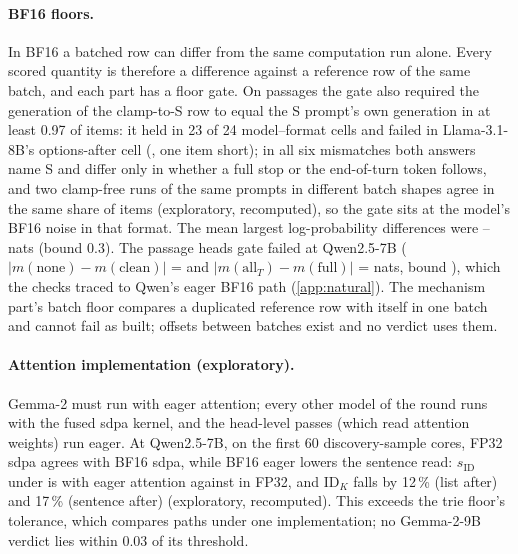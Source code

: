 \paragraph{BF16 floors.} In BF16 a batched row can differ from the same computation run alone. Every scored quantity is therefore a difference against a reference row of the same batch, and each part has a floor gate. On passages the gate also required the generation of the clamp-to-S row to equal the S prompt's own generation in at least 0.97 of items: it held in 23 of 24 model--format cells and failed in Llama-3.1-8B's options-after cell (\JaGoneAgreeOptaLlamaEight{}, one item short); in all six mismatches both answers name S and differ only in whether a full stop or the end-of-turn token follows, and two clamp-free runs of the same prompts in different batch shapes agree in the same share of items (exploratory, recomputed), so the gate sits at the model's BF16 noise in that format. The mean largest log-probability differences were \JaGoneLpMin{}--\JaGoneLpMax{} nats (bound 0.3). The passage heads gate failed at Qwen2.5-7B ($\lvert m(\text{none}) - m(\text{clean})\rvert$ = \JaHaGoneNoneCleanQwenSeven{} and $\lvert m(\text{all}_T) - m(\text{full})\rvert$ = \JaHaGoneAllFullQwenSeven{} nats, bound \JaHaGoneBoundQwenSeven{}), which the checks traced to Qwen's eager BF16 path (\cref{app:natural}). The mechanism part's batch floor compares a duplicated reference row with itself in one batch and cannot fail as built; offsets between batches exist and no verdict uses them. %

\paragraph{Attention implementation (exploratory).} Gemma-2 must run with eager attention; every other model of the round runs with the fused sdpa kernel, and the head-level passes (which read attention weights) run eager. At Qwen2.5-7B, on the first 60 discovery-sample cores, FP32 sdpa agrees with BF16 sdpa, while BF16 eager lowers the sentence read: $s_{\mathrm{ID}}$ under \fmtPost{} is \JbXoneEagerPost{} with eager attention against \JbXoneFpPost{} in FP32, and $\mathrm{ID}_K$ falls by 12\,\% (list after) and 17\,\% (sentence after) (exploratory, recomputed). This exceeds the trie floor's tolerance, which compares paths under one implementation; no Gemma-2-9B verdict lies within 0.03 of its threshold. %

